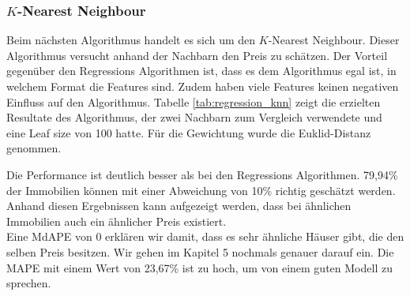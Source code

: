 \subsubsection{$K$-Nearest Neighbour}
Beim nächsten Algorithmus handelt es sich um den $K$-Nearest Neighbour. Dieser Algorithmus versucht anhand der Nachbarn den Preis zu schätzen. Der Vorteil gegenüber den Regressions Algorithmen ist, dass es dem Algorithmus egal ist, in welchem Format die Features sind. Zudem haben viele Features keinen negativen Einfluss auf den Algorithmus.
Tabelle \ref{tab:regression_knn} zeigt die erzielten Resultate des Algorithmus, der zwei Nachbarn zum Vergleich verwendete und eine Leaf size von 100 hatte. Für die Gewichtung wurde die Euklid-Distanz genommen.

\begin{table}[ht]
\centering
{}
\caption{Ergebnisse von $K$-Nearest Neighbour}
\label{tab:regression_knn}
\end{table}

Die Performance ist deutlich besser als bei den Regressions Algorithmen. 79,94\% der Immobilien können mit einer Abweichung von 10\% richtig geschätzt werden. Anhand diesen Ergebnissen kann aufgezeigt werden, dass bei ähnlichen Immobilien auch ein ähnlicher Preis existiert.\\
Eine MdAPE von 0 erklären wir damit, dass es sehr ähnliche Häuser gibt, die den selben Preis besitzen. Wir gehen im Kapitel 5 nochmals genauer darauf ein. Die MAPE mit einem Wert von 23,67\% ist zu hoch, um von einem guten Modell zu sprechen.

